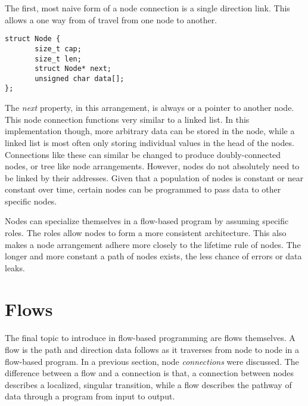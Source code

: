 \par The first, most naive form of a node connection is a single direction link. This allows a one way from of travel from one node to another.

\begin{lstlisting}[style=customc]
struct Node {
       size_t cap;
       size_t len;
       struct Node* next;
       unsigned char data[];
};
\end{lstlisting}

\par The \emph{next} property, in this arrangement, is always  or a pointer to another node. This node connection functions very similar to a linked list. In this implementation though, more arbitrary data can be stored in the node, while a linked list is most often only storing individual values in the head of the nodes. Connections like these can similar be changed to produce doubly-connected nodes, or tree like node arrangements. However, nodes do not absolutely need to be linked by their addresses. Given that a population of nodes is constant or near constant over time, certain nodes can be programmed to pass data to other specific nodes.

\par Nodes can specialize themselves in a flow-based program by assuming specific roles. The roles allow nodes to form a more consistent architecture. This also makes a node arrangement adhere more closely to the lifetime rule of nodes. The longer and more constant a path of nodes exists, the less chance of errors or data leaks.

\section{Flows}

\paragraph{  } The final topic to introduce in flow-based programming are flows themselves. A flow is  the path and direction data follows as it traverses from node to node in a flow-based program. In a previous section, node \emph{connections} were discussed. The difference between a flow and a connection is that, a connection between nodes describes a localized, singular transition, while a flow describes the pathway of data through a program from input to output.




